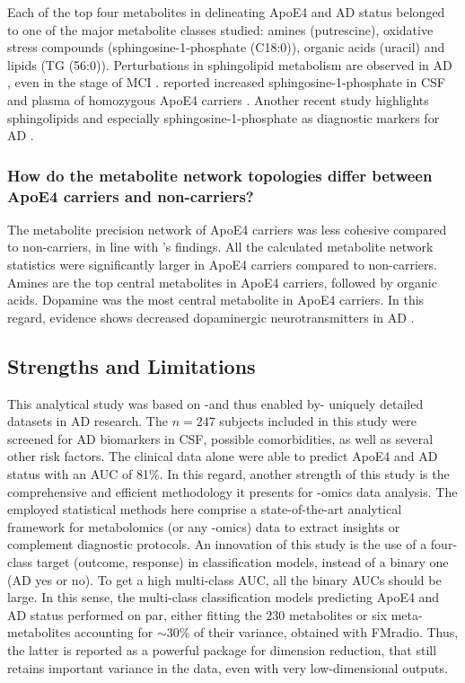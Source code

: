 \documentclass{amsart}
\begin{document}
Each of the top four metabolites in delineating ApoE4 and AD status belonged to one of the major metabolite classes studied: amines (putrescine), oxidative stress compounds (sphingosine-1-phosphate (C18:0)), organic acids (uracil) and lipids (TG (56:0)). Perturbations in sphingolipid metabolism are observed in AD \cite{mielke2010alterations}, even in the stage of MCI \cite{den2023sphingolipids}.  reported increased sphingosine-1-phosphate in CSF and plasma of homozygous ApoE4 carriers \cite{den2023sphingolipids}. Another recent study highlights sphingolipids and especially sphingosine-1-phosphate as diagnostic markers for AD \cite{d2022sphingolipid}.

\subsubsection{How do the metabolite network topologies differ between ApoE4 carriers and non-carriers?}
The metabolite precision network of ApoE4 carriers was less cohesive compared to non-carriers, in line with \citeauthor{deLeeuw2017Blood-basedDisease}'s findings. All the calculated metabolite network statistics were significantly larger in ApoE4 carriers compared to non-carriers. Amines are the top central metabolites in ApoE4 carriers, followed by organic acids. Dopamine was the most central metabolite in ApoE4 carriers. In this regard, evidence shows decreased dopaminergic neurotransmitters in AD \cite{shaikh2023targeting,pan2019dopamine}.

\subsection{Strengths and Limitations} This analytical study was based on -and thus enabled by- uniquely detailed datasets in AD research. The $n = 247$ subjects included in this study were screened for AD biomarkers in CSF, possible comorbidities, as well as several other risk factors. The clinical data alone were able to predict ApoE4 and AD status with an AUC of 81\%. In this regard, another strength of this study is the comprehensive and efficient methodology it presents for -omics data analysis. The employed statistical methods here comprise a state-of-the-art analytical framework for metabolomics (or any -omics) data to extract insights or complement diagnostic protocols. An innovation of this study is the use of a four-class target (outcome, response) in classification models, instead of a binary one (AD yes or no). To get a high multi-class AUC, all the binary AUCs should be large. In this sense, the multi-class classification models predicting ApoE4 and AD status performed on par, either fitting the 230 metabolites or six meta-metabolites accounting for $\sim$30\% of their variance, obtained with \textsf{FMradio}. Thus, the latter is reported as a powerful package for dimension reduction, that still retains important variance in the data, even with very low-dimensional outputs.
\end{document}
